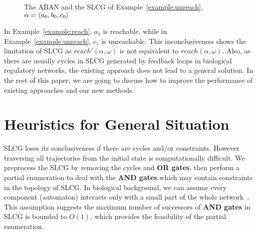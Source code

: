 \documentclass[runningheads]{llncs}
\DeclarePairedDelimiter{\init}{\langle}{\rangle}
\begin{document}
\begin{figure}[ht]
\centering

\caption{The ABAN and the SLCG of Example~\ref{example:unreach}, $\alpha=\init{ a_0,b_0,c_0}$}
\label{fig:3}
\end{figure}
In Example~\ref{example:reach}, $a_1$ is reachable, while in Example~\ref{example:unreach}, $c_1$ is unreachable. This inconclusiveness shows the limitation of SLCG as $reach'(\alpha,\omega)$ is not equivalent to $reach(\alpha,\omega)$.
Also, as there are usually cycles in SLCG generated by feedback loops in biological regulatory networks, the existing approach does not lead to a general solution.
In the rest of this paper, we are going to discuss how to improve the performance of existing approaches and our new methods. 

\section{Heuristics for General Situation}\label{sect:4}
SLCG loses its conclusiveness if there are cycles and/or constraints.
However traversing all trajectories from the initial state is computationally difficult. 
We preprocess the SLCG by removing the cycles and \textbf{OR gates}.
then perform a partial enumeration to deal with the \textbf{AND gates} which may contain constraints in the topology of SLCG.
In biological background, we can assume every component (automaton) interacts only with a small part of the whole network~\cite{akutsu2007control}.
This assumption suggests the maximum number of successors of \textbf{AND gates} in SLCG is bounded to $O(1)$, which provides the feasibility of the partial enumeration.
\end{document}
